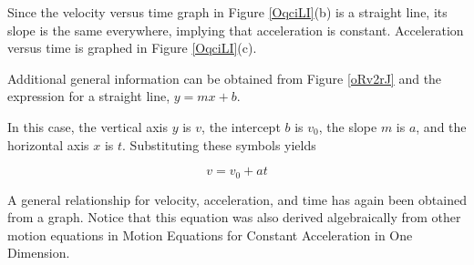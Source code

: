 \documentclass[dvipsnames]{article}
\begin{document}
Since the velocity versus time graph in Figure \ref{OqciLI}(b) is a straight line, its slope is the same everywhere, implying that acceleration is constant. Acceleration versus time is graphed in Figure \ref{OqciLI}(c).

\vspace{1em}

Additional general information can be obtained from Figure \ref{oRv2rJ} and the expression for a straight line, $y = mx + b$.

\vspace{1em}

In this case, the vertical axis $y$ is $v$, the intercept $b$ is $v_0$, the slope $m$ is $a$, and the horizontal axis $x$ is $t$. Substituting these symbols yields

\begin{equation}
    v = v_0 + at
\end{equation}

A general relationship for velocity, acceleration, and time has again been obtained from a graph. Notice that this equation was also derived algebraically from other motion equations in Motion Equations for Constant Acceleration in One Dimension.
\end{document}
